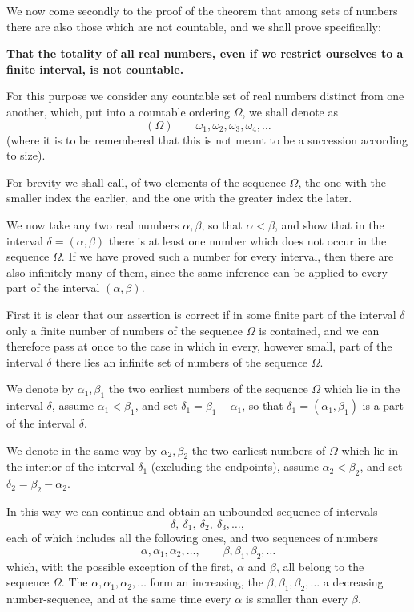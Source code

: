 \documentclass[11pt]{article}
\begin{document}
We now come secondly to the proof of the theorem that among sets of numbers there are also those which are not countable, and we shall prove specifically:

\begin{center}
\textbf{That the totality of all real numbers, even if we restrict ourselves to a finite interval, is not countable.}
\end{center}

For this purpose we consider any countable set of real numbers distinct from one another, which, put into a countable ordering $\Omega$, we shall denote as
\[
(\Omega)\qquad \omega_1,\omega_2,\omega_3,\omega_4,\ldots
\]
(where it is to be remembered that this is not meant to be a succession according to size).

For brevity we shall call, of two elements of the sequence $\Omega$, the one with the smaller index the earlier, and the one with the greater index the later.

We now take any two real numbers $\alpha,\beta$, so that $\alpha<\beta$, and show that in the interval $\delta=(\alpha,\beta)$ there is at least one number which does not occur in the sequence $\Omega$. If we have proved such a number for every interval, then there are also infinitely many of them, since the same inference can be applied to every part of the interval $(\alpha,\beta)$.

First it is clear that our assertion is correct if in some finite part of the interval $\delta$ only a finite number of numbers of the sequence $\Omega$ is contained, and we can therefore pass at once to the case in which in every, however small, part of the interval $\delta$ there lies an infinite set of numbers of the sequence $\Omega$.

We denote by $\alpha_1,\beta_1$ the two earliest numbers of the sequence $\Omega$ which lie in the interval $\delta$, assume $\alpha_1<\beta_1$, and set $\delta_1=\beta_1-\alpha_1$, so that $\delta_1=(\alpha_1,\beta_1)$ is a part of the interval $\delta$.

We denote in the same way by $\alpha_2,\beta_2$ the two earliest numbers of $\Omega$ which lie in the interior of the interval $\delta_1$ (excluding the endpoints), assume $\alpha_2<\beta_2$, and set $\delta_2=\beta_2-\alpha_2$.

In this way we can continue and obtain an unbounded sequence of intervals
\[
\delta,\ \delta_1,\ \delta_2,\ \delta_3,\ldots,
\]
each of which includes all the following ones, and two sequences of numbers
\[
\alpha,\alpha_1,\alpha_2,\ldots,\qquad
\beta,\beta_1,\beta_2,\ldots
\]
which, with the possible exception of the first, $\alpha$ and $\beta$, all belong to the sequence $\Omega$. The $\alpha,\alpha_1,\alpha_2,\ldots$ form an increasing, the $\beta,\beta_1,\beta_2,\ldots$ a decreasing number-sequence, and at the same time every $\alpha$ is smaller than every $\beta$.
\end{document}

